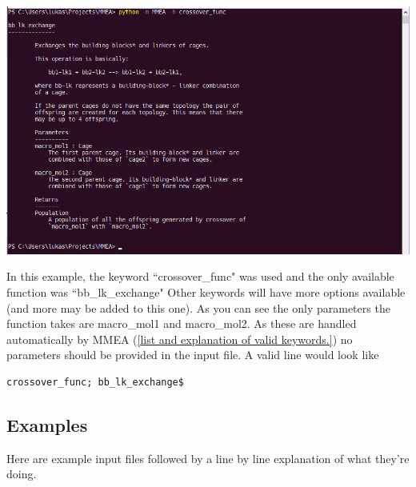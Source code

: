 \documentclass[12pt]{article}
\begin{document}
\includegraphics[scale=0.7]{console2}

In this example, the keyword ``crossover\_func" was used and the only available function was ``bb\_lk\_exchange" Other keywords will have more options available (and more may be added to this one). As you can see the only parameters the function takes are macro\_mol1 and macro\_mol2. As these are handled automatically by MMEA (\ref{list and explanation of valid keywords.}) no parameters should be provided in the input file. A valid line would look like
\begin{verbatim}
crossover_func; bb_lk_exchange$
\end{verbatim}

\subsection{Examples}
\label{examples}
Here are example input files followed by a line by line explanation of what they're doing.
\end{document}
